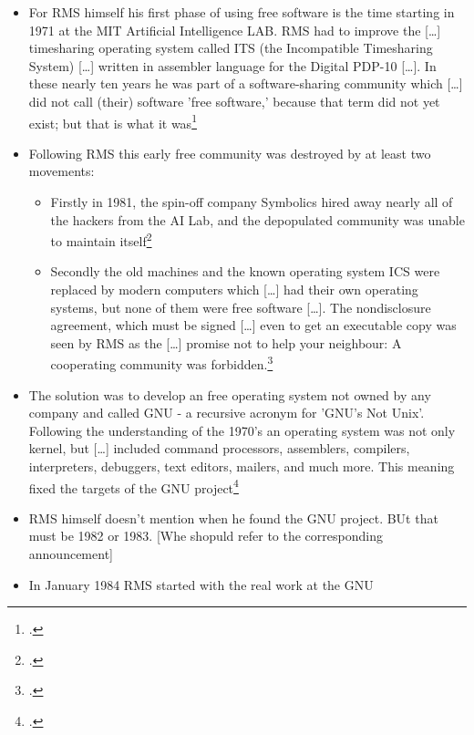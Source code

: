 \documentclass[DIV=calc,BCOR=5mm,11pt,headings=small,oneside,abstract=true, toc=bib]{scrartcl}
\begin{document}
\begin{itemize}
  \item For RMS himself his first phase of using free software is the time
  starting in 1971 \glqq{}at the MIT Artificial Intelligence LAB\grqq{}. RMS had
  to \glqq{}improve\grqq{} the \glqq{}[\ldots] timesharing operating system
  called ITS (the Incompatible Timesharing System) [\ldots] written in assembler
  language for the Digital PDP-10 [\ldots]\grqq{}. In these nearly ten years he
  was \glqq{}part of a software-sharing community\grqq{} which \glqq{}[\ldots] did
  not call (their) software ’free software,’ because that term did not yet
  exist; but that is what it was\grqq{}\footcite[cf][15]{Stallman1999a}
  \item Following RMS this early free community was destroyed by at least two
  movements:
  \begin{itemize}
  	\item Firstly \glqq{}in 1981, the spin-off company Symbolics hired away nearly
  	all of the hackers from the AI Lab, and the depopulated community was unable to
  	maintain itself\grqq{}\footcite[cf][15]{Stallman1999a}
  	\item Secondly the old machines and the known operating system ICS were
  	replaced by modern computers which \glqq{} [\ldots] had their own operating
  	systems, but none of them were free software [\ldots]\grqq{}. The
  	\glqq{}nondisclosure agreement\grqq{}, which must be signed \glqq{}[\ldots]
  	even to get an executable copy\grqq{} was seen by RMS as the \glqq{}[\ldots]
  	promise not to help your neighbour\grqq{}: \glqq{}A cooperating community was
  	forbidden.\grqq{}\footcite[cf][16]{Stallman1999a}
  \end{itemize}
  \item The solution was to develop an free operating system not owned by any
  company and called GNU - \glqq{}a recursive acronym for ’GNU’s Not
  Unix’\grqq{}. Following the understanding of the 1970’s an operating system
  was not only kernel, but \glqq{}[\ldots] included command processors,
  assemblers, compilers, interpreters, debuggers, text editors, mailers, and
  much more\grqq{}. This meaning fixed the targets of the GNU
  project\footcite[cf][17]{Stallman1999a}
  \item RMS himself doesn’t mention when he found the GNU project. BUt that must
  be 1982 or 1983. [Whe shopuld refer to the corresponding announcement]
  \item \glqq{}In January 1984\grqq{} RMS started with the real work at the GNU

\end{itemize}
\end{document}
